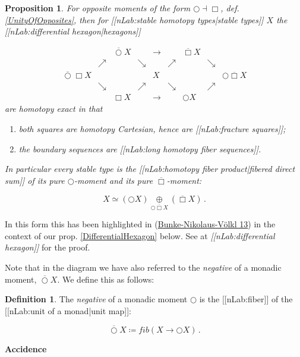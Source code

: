 \documentclass[12pt,titlepage]{article}
\newcommand{\itexarray}[1]{\begin{matrix}#1\end{matrix}}
\theoremstyle{plain}
\newtheorem{prop}{Proposition}
\theoremstyle{definition}
\newtheorem{defn}{Definition}
\theoremstyle{remark}
\begin{document}
\begin{prop}
\label{TheHexagon}\hypertarget{TheHexagon}{}
For opposite moments of the form $\bigcirc \dashv \Box$, def. \ref{UnityOfOpposites}, then for [[nLab:stable homotopy types|stable types]] $X$ the [[nLab:differential hexagon|hexagons]]

\begin{displaymath}
\itexarray{
    && \overline{\bigcirc} X && \longrightarrow && \overline{\Box} X
    \\
    &\nearrow& &\searrow& & \nearrow && \searrow
    \\
    \overline{\bigcirc} \Box X && && X && && \bigcirc \overline{\Box} X
    \\
    &\searrow& &\nearrow & & \searrow && \nearrow
    \\
    && \Box X && \longrightarrow && \bigcirc X
  }
\end{displaymath}
are homotopy exact in that

\begin{enumerate}%
\item both squares are homotopy Cartesian, hence are [[nLab:fracture squares]];


\item the boundary sequences are [[nLab:long homotopy fiber sequences]].



\end{enumerate}
In particular every stable type is the [[nLab:homotopy fiber product|fibered direct sum]] of its pure $\bigcirc$-moment and its pure $\overline{\Box}$-moment:

\begin{displaymath}
X \simeq (\bigcirc X) \underset{\bigcirc \overline{\Box} X}{\oplus} (\overline{\Box} X)
  \,.
\end{displaymath}
\end{prop}
In this form this has been highlighted in (\hyperlink{BunkeNikolausVoelkl13}{Bunke-Nikolaus-Völkl 13}) in the context of our prop. \ref{DifferentialHexagon} below. See at \emph{[[nLab:differential hexagon]]} for the proof.

Note that in the diagram we have also referred to the \emph{negative} of a monadic moment, $\overline{\bigcirc} X$. We define this as follows:

\begin{defn}
\label{NegativeMonadicMoment}\hypertarget{NegativeMonadicMoment}{}
The \emph{negative} of a monadic moment $\bigcirc$ is the [[nLab:fiber]] of the [[nLab:unit of a monad|unit map]]:

\begin{displaymath}
\overline{\bigcirc} X \coloneqq fib(X \to \bigcirc X)
  \,.
\end{displaymath}
\end{defn}
\textbf{Accidence}
\end{document}
